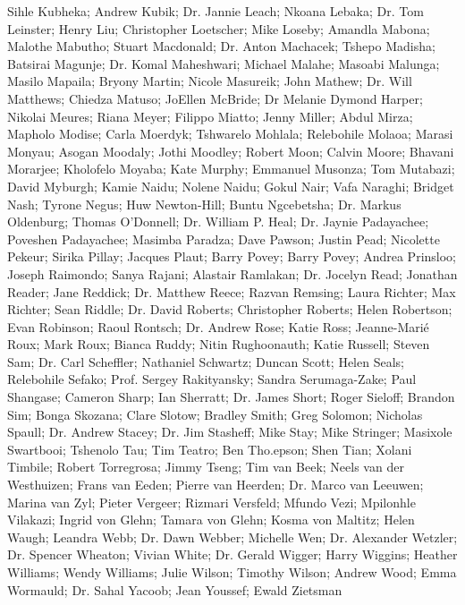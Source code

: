     Sihle Kubheka;
    Andrew Kubik;
Dr. Jannie Leach;
    Nkoana Lebaka;
Dr. Tom Leinster;
    Henry Liu;
    Christopher Loetscher;
    Mike Loseby;
    Amandla Mabona;
    Malothe Mabutho;
    Stuart Macdonald;
Dr. Anton Machacek;
    Tshepo Madisha;
    Batsirai Magunje;
Dr. Komal Maheshwari;
    Michael Malahe;
    Masoabi Malunga;
    Masilo Mapaila;
    Bryony Martin;
    Nicole Masureik;
    John Mathew;
Dr. Will Matthews;
    Chiedza Matuso;
    JoEllen McBride;
    Dr Melanie Dymond Harper;
    Nikolai Meures;
    Riana Meyer;
    Filippo Miatto;
    Jenny Miller;
    Abdul Mirza;
    Mapholo Modise;
    Carla Moerdyk;
    Tshwarelo Mohlala;
    Relebohile Molaoa;
    Marasi Monyau;
    Asogan Moodaly;
    Jothi Moodley;
    Robert Moon;
    Calvin Moore;
    Bhavani Morarjee;
    Kholofelo Moyaba;
    Kate Murphy;
    Emmanuel Musonza;
    Tom Mutabazi;
    David Myburgh;
    Kamie Naidu;
    Nolene Naidu;
    Gokul Nair;
    Vafa Naraghi;
    Bridget Nash;
    Tyrone Negus;
    Huw Newton-Hill;
    Buntu Ngcebetsha;
Dr. Markus Oldenburg;
    Thomas O’Donnell;
Dr. William P. Heal;
Dr. Jaynie Padayachee;
    Poveshen Padayachee;
    Masimba Paradza;
    Dave Pawson;
    Justin Pead;
    Nicolette Pekeur;
    Sirika Pillay;
    Jacques Plaut;
    Barry Povey;
    Barry Povey;
    Andrea Prinsloo;
    Joseph Raimondo;
    Sanya Rajani;
    Alastair Ramlakan;
Dr. Jocelyn Read;
    Jonathan Reader;
    Jane Reddick;
Dr. Matthew Reece;
    Razvan Remsing;
    Laura Richter;
    Max Richter;
    Sean Riddle;
Dr. David Roberts;
    Christopher Roberts;
    Helen Robertson;
    Evan Robinson;
    Raoul Rontsch;
Dr. Andrew Rose;
    Katie Ross;
    Jeanne-Marié Roux;
    Mark Roux;
    Bianca Ruddy;
    Nitin Rughoonauth;
    Katie Russell;
    Steven Sam;
Dr. Carl Scheffler;
    Nathaniel Schwartz;
    Duncan Scott;
    Helen Seals;
    Relebohile Sefako;
    Prof. Sergey Rakityansky;
    Sandra Serumaga-Zake;
    Paul Shangase;
    Cameron Sharp;
    Ian Sherratt;
Dr. James Short;
    Roger Sieloff;
    Brandon Sim;
    Bonga Skozana;
    Clare Slotow;
    Bradley Smith;
    Greg Solomon;
    Nicholas Spaull;
Dr. Andrew Stacey;
Dr. Jim Stasheff;
    Mike Stay;
    Mike Stringer;
    Masixole Swartbooi;
    Tshenolo Tau;
    Tim Teatro;
    Ben Tho.epson;
    Shen Tian;
    Xolani Timbile;
    Robert Torregrosa;
    Jimmy Tseng;
    Tim van Beek;
    Neels van der Westhuizen;
    Frans van Eeden;
    Pierre van Heerden;
Dr. Marco van Leeuwen;
    Marina van Zyl;
    Pieter Vergeer;
    Rizmari Versfeld;
    Mfundo Vezi;
    Mpilonhle Vilakazi;
    Ingrid von Glehn;
    Tamara von Glehn;
    Kosma von Maltitz;
    Helen Waugh;
    Leandra Webb;
Dr. Dawn Webber;
    Michelle Wen;
Dr. Alexander Wetzler;
Dr. Spencer Wheaton;
    Vivian White;
Dr. Gerald Wigger;
    Harry Wiggins;
    Heather Williams;
    Wendy Williams;
    Julie Wilson;
    Timothy Wilson;
    Andrew Wood;
    Emma Wormauld;
Dr. Sahal Yacoob;
    Jean Youssef;
    Ewald Zietsman 








